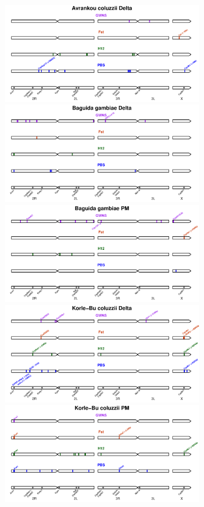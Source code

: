 \documentclass[a4paper,12pt]{article}
\begin{document}
\clearpage

\begin{figure}[h]
	\hspace{-0.3cm}\includegraphics*[width = 8.4cm]{../supplementary_implicated_regions/Avrankou_coluzzii_Delta_implicated_regions.pdf}
	\vskip 0.4cm
	\hspace{-0.3cm}\includegraphics*[width = 8.4cm]{../supplementary_implicated_regions/Baguida_gambiae_Delta_implicated_regions.pdf}
	\hspace{-0.3cm}\includegraphics*[width = 8.4cm]{../supplementary_implicated_regions/Baguida_gambiae_PM_implicated_regions.pdf}
	\vskip 0.4cm
	\hspace{-0.3cm}\includegraphics*[width = 8.4cm]{../supplementary_implicated_regions/Korle-Bu_coluzzii_Delta_implicated_regions.pdf}
	\hspace{-0.3cm}\includegraphics*[width = 8.4cm]{../supplementary_implicated_regions/Korle-Bu_coluzzii_PM_implicated_regions.pdf}

\end{figure}
\end{document}
